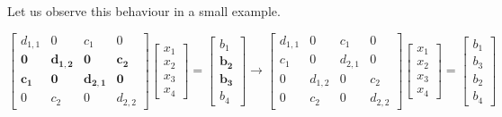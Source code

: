 \documentclass{article}
\begin{document}
\pagebreak

\noindent Let us observe this behaviour in a small example. 

\begin{equation*}
    \begin{bmatrix}
        d_{1,1}  & 0 & c_{1}  & 0 \\
        \mathbf{0} & \mathbf{d_{1,2}}  & \mathbf{0} & \mathbf{c_{2}}  \\
        \mathbf{c_{1}} & \mathbf{0} & \mathbf{d_{2,1}} & \mathbf{0} \\
        0 & c_{2}  & 0 & d_{2,2}  
    \end{bmatrix}\begin{bmatrix}
        x_{1} \\x_{2} \\x_{3} \\ x_{4}
    \end{bmatrix} =
    \begin{bmatrix}
        b_{1} \\ \mathbf{b_{2}} \\ \mathbf{b_{3}} \\ b_{4}
    \end{bmatrix} \longrightarrow \begin{bmatrix}
        d_{1,1}  & 0 & c_{1}  & 0 \\
        c_{1} & 0  & d_{2,1} & 0  \\
        0 & d_{1,2} & 0 & c_{2}\\
        0 & c_{2}  & 0 & d_{2,2}  
    \end{bmatrix}\begin{bmatrix}
        x_{1} \\x_{2} \\x_{3} \\ x_{4}
    \end{bmatrix} =
    \begin{bmatrix}
        b_{1} \\ b_{3} \\ b_{2} \\ b_{4}
    \end{bmatrix}
\end{equation*}
\end{document}
